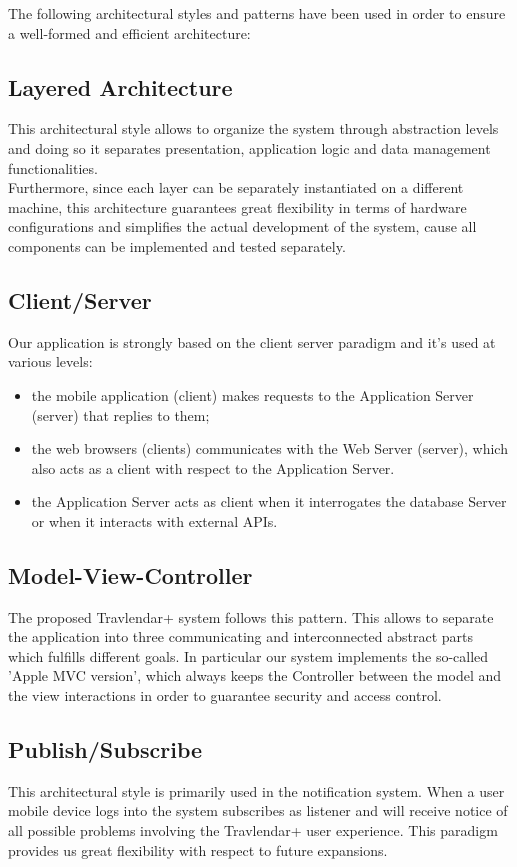 The following architectural styles and patterns have been used in order to ensure a well-formed and efficient architecture:

\subsection{Layered Architecture}
\label{subsect:Layered Architecture}
This architectural style allows to organize the system through abstraction levels and doing so it separates presentation, application logic and data management functionalities.\\ Furthermore, since each layer can be separately instantiated on a
different machine, this architecture guarantees great flexibility in terms of hardware configurations and simplifies the actual development of the system, cause all components can be implemented and tested separately.

\subsection{Client/Server}
\label{subsect:Client/Server}
Our application is strongly based on the client server paradigm and it's used at various levels:
\begin{itemize}
	\item the mobile application (client) makes requests to the Application Server (server) that replies to them;
	\item the web browsers (clients) communicates with the Web Server (server), which also acts as a client with respect to the Application Server.
	\item the Application Server acts as client when it interrogates the database Server or when it interacts with external APIs.
\end{itemize}

\subsection{Model-View-Controller}
\label{subsect:Model-View-Controller}
The proposed Travlendar+ system follows this pattern. This allows to separate the application into three communicating and interconnected abstract parts which fulfills different goals. In particular our system implements the so-called 'Apple MVC version', which always keeps the Controller between the model and the view interactions in order to guarantee security and access control. 

\subsection{Publish/Subscribe}
\label{subsect:Publish/Subscribe}
This architectural style is primarily used in the notification system. When a user mobile device logs into the system subscribes as listener and will receive notice of all possible problems involving the Travlendar+ user experience. This paradigm provides us great flexibility with respect to future expansions.

